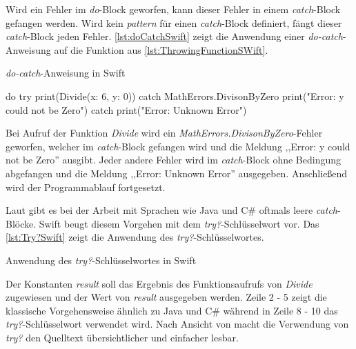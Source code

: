 Wird ein Fehler im \textit{do}-Block geworfen, kann dieser Fehler in einem \textit{catch}-Block gefangen werden. 
Wird kein \textit{pattern} für einen \textit{catch}-Block definiert, fängt dieser \textit{catch}-Block jeden Fehler. 
\autoref{lst:doCatchSwift} zeigt die Anwendung einer \textit{do-catch}-Anweisung auf die Funktion aus \autoref{lst:ThrowingFunctionSWift}.

\begin{listing}[H]
\caption{\textit{do-catch}-Anweisung in Swift}
\label{lst:doCatchSwift}
\begin{SwiftCode}
do {
    try print(Divide(x: 6, y: 0))	
} catch MathErrors.DivisonByZero {	
    print("Error: y could not be Zero")
} catch {
    print("Error: Unknown Error")
}
\end{SwiftCode}
\end{listing}

Bei Aufruf der Funktion \textit{Divide} wird ein \textit{MathErrors.DivisonByZero}-Fehler geworfen, welcher im \textit{catch}-Block gefangen wird und die Meldung ,,Error: y could not be Zero'' ausgibt. 
Jeder andere Fehler wird im \textit{catch}-Block ohne Bedingung abgefangen und die Meldung ,,Error: Unknown Error'' ausgegeben.
Anschließend wird der Programmablauf fortgesetzt.

Laut \cite[S.181]{Hoffman.2017} gibt es bei der Arbeit mit Sprachen wie Java und C\# oftmals leere \textit{catch}-Blöcke. 
Swift beugt diesem Vorgehen mit dem \textit{try?}-Schlüsselwort vor. 
Das \autoref{lst:Try?Swift} zeigt die Anwendung des \textit{try?}-Schlüsselwortes.

\begin{listing}[H]
\caption{Anwendung des \textit{try?}-Schlüsselwortes in Swift}
\label{lst:Try?Swift}
\end{listing}

Der Konstanten \textit{result} soll das Ergebnis des Funktionsaufrufs von \textit{Divide} zugewiesen und der Wert von \textit{result} ausgegeben werden. 
Zeile 2 - 5 zeigt die klassische Vorgehensweise ähnlich zu Java und C\# während in Zeile 8 - 10 das \textit{try?}-Schlüsselwort verwendet wird.
Nach Ansicht von \cite[S.181]{Hoffman.2017} macht die Verwendung von \textit{try?} den Quelltext übersichtlicher und einfacher lesbar.

